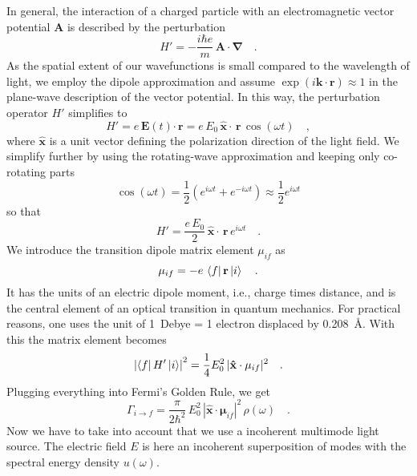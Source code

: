 In general, the interaction of a charged particle with an electromagnetic vector potential $\mathbf{A}$ is described by the perturbation
\begin{equation}
 H' = - \frac{i \hbar e}{m} \, \mathbf{A \cdot \nabla}  \quad .
\end{equation}
As the spatial extent of our wavefunctions is small compared to the wavelength of light, we employ the dipole approximation and assume $\exp( i \mathbf{k \cdot r}) \approx 1$ in the plane-wave description of the vector potential. In this way, the  perturbation operator $H'$ simplifies to
\begin{equation}
 H' =  e \, \mathbf{E} (t)  \mathbf{\cdot \, r} =  e \,E_0 \,  \mathbf{\hat{x} \cdot \, r} \, \cos(\omega t) \quad ,
\end{equation}
where $\mathbf{\hat{x}} $ is a unit vector defining the polarization direction of the light field. We simplify further by using the rotating-wave approximation and keeping only co-rotating parts 
\begin{equation}
 \cos(\omega t)
 = \frac{1}{2} \left( e^{i \omega t}+  e^{-i \omega t} \right)
 \approx  \frac{1}{2}  e^{i \omega t} 
\end{equation}
so that 
\begin{equation}
H' =  \frac{ e \,E_0}{2}  \,  \mathbf{\hat{x} \cdot \, r} \,  e^{i \omega t}  \quad .
\end{equation}
%
 We introduce the transition dipole matrix element $\mu_{if}$ as
\begin{equation}
\mathbf{\mu}_{if} = -e \, \bra{f}    \mathbf{r} \ket{i}  \quad .
\end{equation}
It has the units of an electric dipole moment, i.e., charge times distance, and is the central element of an optical transition in quantum mechanics. For practical reasons, one uses the unit of 1~Debye = 1 electron displaced by 0.208~\AA.
With this the matrix element  becomes
\begin{equation}
\left| \bra{f} H' \ket{i} \right|^2 =  \frac{1}{4} E_0^2  \, |\mathbf{\hat{x}} \cdot \mathbf{\mu}_{if} |^2 \quad .
\end{equation}
Plugging everything into Fermi's Golden Rule, we get
\begin{equation}
 \Gamma_{i \rightarrow f} = \frac{\pi}{2 \hbar^2} \,  E_0^2  \, |\mathbf{\hat{x}} \cdot \mathbf{\mu}_{if} |^2 \, \rho(\omega) \quad .
\end{equation}
Now we have to take into account that we use a incoherent multimode light source. The electric field $E$ is here an incoherent superposition of  modes with the  spectral energy density $u(\omega)$.
